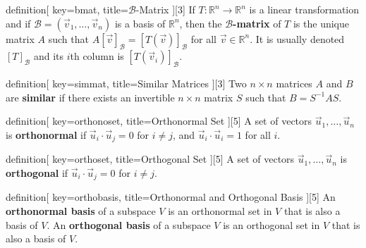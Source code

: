 \begin{SaveConcept}{definition}[
		key=bmat,
		title={$\mathcal{B}$-Matrix}
	][3]
 If $T:\mathbb R^n\to \mathbb R^n$ is a linear transformation and if $\mathcal{B}=(\vec{v}_1,\ldots,\vec{v}_n)$ is a basis of $\mathbb R^n$, then the {\bf $\mathcal{B}$-matrix} of $T$ is the unique matrix $A$ such that $A[\vec{v}]_{\mathcal{B}}=[T(\vec{v})]_{\mathcal{B}}$ for all $\vec{v}\in \mathbb R^n$. It is usually denoted $[T]_{\mathcal{B}}$ and its $i$th column is $[T(\vec{v}_i)]_{\mathcal{B}}$.
\end{SaveConcept}


\begin{SaveConcept}{definition}[
		key=simmat,
		title={Similar Matrices}
	][3]
        Two $n\times n$ matrices $A$ and $B$ are {\bf similar} if there exists an invertible $n\times n$ matrix $S$ such that $B = S^{-1} A S$.
\end{SaveConcept}


\begin{SaveConcept}{definition}[
		key=orthonoset,
		title={Orthonormal Set}
	][5]
        A set of vectors $\vec u_1, \dots, \vec u_n$ is {\bf orthonormal} if $\vec u_i\cdot \vec u_j = 0 $ for  $ i \neq j$, and $\vec u_i\cdot \vec u_i = 1$ for all $i$. 
\end{SaveConcept}

\begin{SaveConcept}{definition}[
		key=orthoset,
		title={Orthogonal Set}
	][5]
        A set of vectors $\vec u_1, \dots, \vec u_n$ is {\bf orthogonal} if $\vec u_i\cdot \vec u_j = 0 $ for  $ i \neq j$. 
\end{SaveConcept}

\begin{SaveConcept}{definition}[
		key=orthobasis,
		title={Orthonormal and Orthogonal Basis}
	][5]
        An {\bf orthonormal basis} of a subspace $V$ is an orthonormal set in $V$ that is also a basis of $V$. An {\bf orthogonal basis} of a subspace $V$ is an orthogonal set in $V$ that is also a basis of $V$.
\end{SaveConcept}


